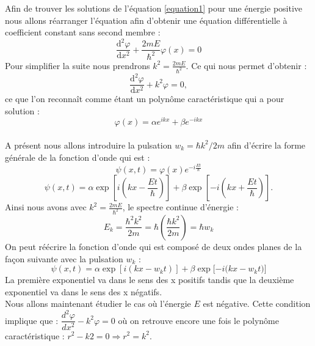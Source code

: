 \documentclass[11pt]{report}
\begin{document}
Afin de trouver les solutions de l'équation \ref{equation1} pour une énergie positive nous allons réarranger l'équation afin d'obtenir une équation différentielle à coefficient constant sans second membre :
\begin{equation}
\dfrac{\mathrm{d}^2 \varphi}{\mathrm{d} x^2}+\frac{2mE}{\hbar^2}\varphi(x) = 0 \nonumber
\end{equation}
Pour simplifier la suite nous prendrons $k^2 = \frac{2mE}{\hbar^2}$.
Ce qui nous permet d'obtenir : 
\begin{equation} \dfrac{\mathrm{d}^2 \varphi}{\mathrm{d} x^2}+k^2\varphi = 0 , \nonumber \end{equation} ce que l'on reconnaît comme étant un polynôme caractéristique qui a pour solution : \begin{equation} \varphi(x) = \alpha e^{ikx} + \beta e^{-ikx} \nonumber\end{equation} \\
A présent nous allons introduire la pulsation $w_k = \hbar k^2/2m$ afin d'écrire la forme générale de la fonction d'onde qui est : \begin{equation} \psi(x,t) = \varphi(x) e^{-i\frac{Et}{\hbar}} \nonumber\end{equation}
\begin{equation} \psi(x,t) = \alpha \exp{[i(kx-\frac{Et}{\hbar})]} +\beta \exp{[-i(kx+\frac{Et}{\hbar})]}.  \nonumber \end{equation}
Ainsi nous avons avec $k^2 = \frac{2mE}{\hbar^2}$, le spectre continue d'énergie : \begin{equation} E_k = \frac{\hbar^2 k^2}{2m} =\hbar(\frac{\hbar k^2}{2m}) =\hbar w_k \nonumber \end{equation}
On peut réécrire la fonction d'onde qui est composé de deux ondes planes de la façon suivante avec la pulsation $w_k$ : \begin{equation} \psi(x,t) = \alpha \exp{[i(kx-w_kt)]} + \beta \exp{[-i(kx-w_kt})] \end{equation}
La première exponentiel va dans le sens des x positifs tandis que la deuxième exponentiel va dans le sens des x négatifs.\\

Nous allons maintenant étudier le cas où l'énergie $E$ est négative. Cette condition implique que : $\dfrac{d^2 \varphi}{dx^2} - k^2\varphi = 0$ où on retrouve encore une fois le polynôme caractéristique : $r^2 - k2 = 0 \Rightarrow r^2 = k^2 $.\\
\end{document}
